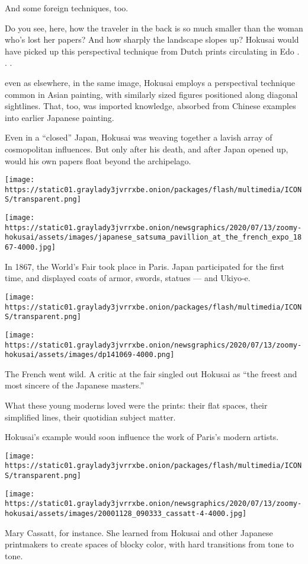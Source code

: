 And some foreign techniques, too.

Do you see, here, how the traveler in the back is so much smaller than
the woman who's lost her papers? And how sharply the landscape slopes
up? Hokusai would have picked up this perspectival technique from Dutch
prints circulating in Edo . . .

even as elsewhere, in the same image, Hokusai employs a perspectival
technique common in Asian painting, with similarly sized figures
positioned along diagonal sightlines. That, too, was imported knowledge,
absorbed from Chinese examples into earlier Japanese painting.

Even in a ``closed'' Japan, Hokusai was weaving together a lavish array
of cosmopolitan influences. But only after his death, and after Japan
opened up, would his own papers float beyond the archipelago.

\texttt{[image: https://static01.graylady3jvrrxbe.onion/packages/flash/multimedia/ICONS/transparent.png]}

\texttt{[image: https://static01.graylady3jvrrxbe.onion/newsgraphics/2020/07/13/zoomy-hokusai/assets/images/japanese\_satsuma\_pavillion\_at\_the\_french\_expo\_1867-4000.jpg]}

In 1867, the World's Fair took place in Paris. Japan participated for
the first time, and displayed coats of armor, swords, statues --- and
Ukiyo-e.

\texttt{[image: https://static01.graylady3jvrrxbe.onion/packages/flash/multimedia/ICONS/transparent.png]}

\texttt{[image: https://static01.graylady3jvrrxbe.onion/newsgraphics/2020/07/13/zoomy-hokusai/assets/images/dp141069-4000.png]}

The French went wild. A critic at the fair singled out Hokusai as ``the
freest and most sincere of the Japanese masters.''

What these young moderns loved were the prints: their flat spaces, their
simplified lines, their quotidian subject matter.

Hokusai's example would soon influence the work of Paris's modern
artists.

\texttt{[image: https://static01.graylady3jvrrxbe.onion/packages/flash/multimedia/ICONS/transparent.png]}

\texttt{[image: https://static01.graylady3jvrrxbe.onion/newsgraphics/2020/07/13/zoomy-hokusai/assets/images/20001128\_090333\_cassatt-4-4000.jpg]}

Mary Cassatt, for instance. She learned from Hokusai and other Japanese
printmakers to create spaces of blocky color, with hard transitions from
tone to tone.

